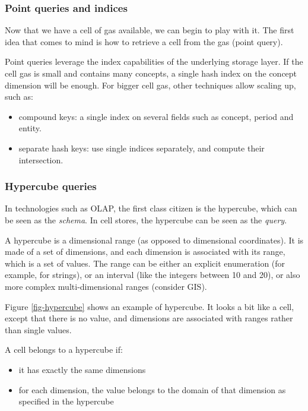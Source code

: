 \documentclass{vldb}
\begin{document}
\subsubsection{Point queries and indices}

Now that we have a cell of gas available, we can begin to play with it. The first idea that comes to mind is how to retrieve a cell from the gas (point query).

Point queries leverage the index capabilities of the underlying storage layer. If the cell gas is small and contains many concepts, a single hash index on the concept dimension will be enough. For bigger cell gas, other techniques allow scaling up, such as:
\begin{itemize}
\item compound keys: a single index on several fields such as concept, period and entity.
\item separate hash keys: use single indices separately, and compute their intersection.
\end{itemize}

\subsubsection{Hypercube queries}
In technologies such as OLAP, the first class citizen is the hypercube, which can be seen as the \emph{schema}. In cell stores, the hypercube can be seen as the \emph{query}.

A hypercube is a dimensional range (as opposed to dimensional coordinates). It is made of a set of dimensions, and each dimension is associated with its range, which is a set of values. The range can be either an explicit enumeration (for example, for strings), or an interval (like the integers between 10 and 20), or also more complex multi-dimensional ranges (consider GIS).

Figure \ref{fig-hypercube} shows an example of hypercube. It looks a bit like a cell, except that there is no value, and dimensions are associated with ranges rather than single values.

A cell belongs to a hypercube if:

\begin{itemize}
\item it has exactly the same dimensions
\item for each dimension, the value belongs to the domain of that dimension as specified in the hypercube
\end{itemize}
\end{document}
